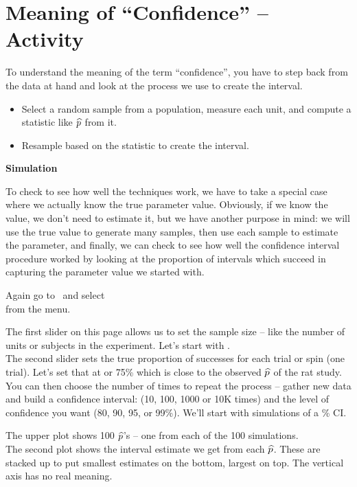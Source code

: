 
\def\theTopic{Confidence }
\def\dayNum{7}


\section{ Meaning of ``Confidence'' -- Activity}

To understand the meaning of the term ``confidence'', you have to step
back from the data at hand and look at the process we use to create
the interval.
\begin{itemize}
  \item Select a random sample from a population, measure each unit,
    and compute a  statistic like $\widehat{p}$ from it.
  \item Resample based on the statistic to create the interval.
  \end{itemize}

  \begin{center}
    {\large \bf Simulation}
  \end{center}

To check to see how well the techniques work, we have to take a
 special case where we actually know the true parameter value.
 Obviously, if we know the value, we don't need to estimate it, but we
 have another purpose in mind: we will use the true value to generate
 many samples, then use each sample to estimate the parameter, and
 finally, we can check to see how well the confidence interval
 procedure worked by looking at the proportion of intervals which
 succeed in capturing the parameter value we started with.

 Again go to \webAppURLFrst \ 
 and select \\
   from the  menu.
 
 The first slider on this page allows us to set the sample size --
 like the number of units or subjects in the experiment.  Let's start with
 \fbox{40}.\\
 The second slider sets the true proportion of successes for each
 trial or spin (one trial).  Let's set that at \fbox{0.75} or 75\%
 which is close to the observed $\widehat{p}$ of the rat study.\\
 You can then choose the number of times to repeat the process -- gather
 new data and build a confidence interval: (10, 100, 1000 or 10K
 times) and the level of confidence you want (80, 90, 95, or 99\%). 
 We'll start with \fbox{100} simulations of a \fbox{90}\% CI.

  The upper plot shows 100  $\widehat{p}$'s -- one from each of the 100 simulations.
  \\
  The second plot shows the interval estimate we get from each
  $\widehat{p}$.  These  are stacked up to put smallest estimates on the
  bottom, largest on top. The vertical axis has no real meaning. 

